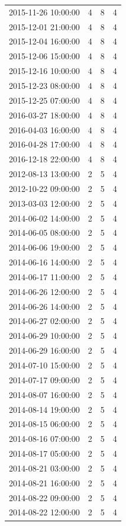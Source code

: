 \begin{tabular}{lrrr}
2015-11-26 10:00:00 & 4 & 8 & 4 \\
2015-12-01 21:00:00 & 4 & 8 & 4 \\
2015-12-04 16:00:00 & 4 & 8 & 4 \\
2015-12-06 15:00:00 & 4 & 8 & 4 \\
2015-12-16 10:00:00 & 4 & 8 & 4 \\
2015-12-23 08:00:00 & 4 & 8 & 4 \\
2015-12-25 07:00:00 & 4 & 8 & 4 \\
2016-03-27 18:00:00 & 4 & 8 & 4 \\
2016-04-03 16:00:00 & 4 & 8 & 4 \\
2016-04-28 17:00:00 & 4 & 8 & 4 \\
2016-12-18 22:00:00 & 4 & 8 & 4 \\
2012-08-13 13:00:00 & 2 & 5 & 4 \\
2012-10-22 09:00:00 & 2 & 5 & 4 \\
2013-03-03 12:00:00 & 2 & 5 & 4 \\
2014-06-02 14:00:00 & 2 & 5 & 4 \\
2014-06-05 08:00:00 & 2 & 5 & 4 \\
2014-06-06 19:00:00 & 2 & 5 & 4 \\
2014-06-16 14:00:00 & 2 & 5 & 4 \\
2014-06-17 11:00:00 & 2 & 5 & 4 \\
2014-06-26 12:00:00 & 2 & 5 & 4 \\
2014-06-26 14:00:00 & 2 & 5 & 4 \\
2014-06-27 02:00:00 & 2 & 5 & 4 \\
2014-06-29 10:00:00 & 2 & 5 & 4 \\
2014-06-29 16:00:00 & 2 & 5 & 4 \\
2014-07-10 15:00:00 & 2 & 5 & 4 \\
2014-07-17 09:00:00 & 2 & 5 & 4 \\
2014-08-07 16:00:00 & 2 & 5 & 4 \\
2014-08-14 19:00:00 & 2 & 5 & 4 \\
2014-08-15 06:00:00 & 2 & 5 & 4 \\
2014-08-16 07:00:00 & 2 & 5 & 4 \\
2014-08-17 05:00:00 & 2 & 5 & 4 \\
2014-08-21 03:00:00 & 2 & 5 & 4 \\
2014-08-21 16:00:00 & 2 & 5 & 4 \\
2014-08-22 09:00:00 & 2 & 5 & 4 \\
2014-08-22 12:00:00 & 2 & 5 & 4 \\

\end{tabular}

